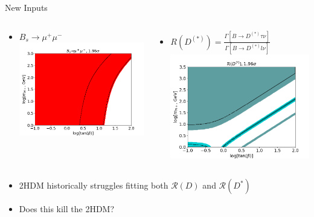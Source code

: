 \documentclass[10pt,xcolor={table,dvipsnames},t]{beamer}
\begin{document}
\begin{frame}{New Inputs}
    \begin{columns}[c]
        \begin{column}{0.45\textwidth}
            \begin{itemize}
                \item $B_s\to\mu^+\mu^-$ 
                    \includegraphics[scale=0.25]{mumu}
            \end{itemize}
        \end{column}
        \begin{column}{0.45\textwidth}
            \begin{itemize}
                \item $R(D^{(*)}) = \frac{\Gamma[B\to D^{(*)}\tau\nu]}{\Gamma[B\to D^{(*)}l\nu]}$ 
                    \includegraphics[scale=0.25]{rd_95both}
            \end{itemize}
        \end{column}
    \end{columns}
    \begin{itemize}
        \item 2HDM historically struggles fitting both $\mathcal{R}(D)$ and $\mathcal{R}(D^*)$
        \item Does this kill the 2HDM?
    \end{itemize}
\end{frame}
\end{document}
